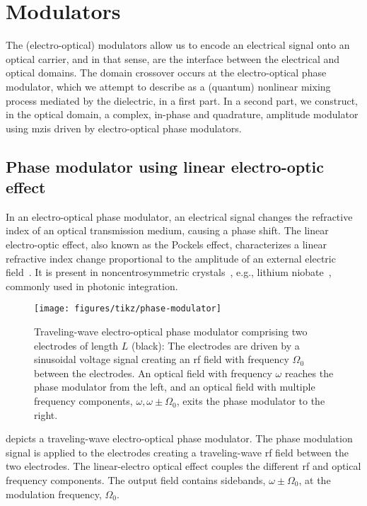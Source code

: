 \section{Modulators}

The (electro-optical) modulators allow us to encode an electrical signal onto an optical carrier, and in that sense, are the interface between the electrical and optical domains.
The domain crossover occurs at the electro-optical phase modulator, which we attempt to describe as a (quantum) nonlinear mixing process mediated by the dielectric, in a first part.
In a second part, we construct, in the optical domain, a complex, in-phase and quadrature, amplitude modulator using \gls{mzi}s driven by electro-optical phase modulators.

\subsection{Phase modulator using linear electro-optic effect}

In an electro-optical phase modulator, an electrical signal changes the refractive index of an optical transmission medium, causing a phase shift.
The linear electro-optic effect, also known as the Pockels effect, characterizes a linear refractive index change proportional to the amplitude of an external electric field~\cite[Ch.~18]{Saleh2007}.
It is present in noncentrosymmetric crystals~\cite[p.~2]{Boyd2020}, e.g., lithium niobate~\cite[p.~237]{Yariv1984}, commonly used in photonic integration.
\begin{figure}[htb]
    \centering
    \texttt{[image: figures/tikz/phase-modulator]}
    \caption{Traveling-wave electro-optical phase modulator comprising two electrodes of length $L$ (black): The electrodes are driven by a sinusoidal voltage signal creating an \gls{rf} field with frequency $\Omega_0$ between the electrodes. An optical field with frequency $\omega$ reaches the phase modulator from the left, and an optical field with multiple frequency components, $\omega,\omega\pm\Omega_0$, exits the phase modulator to the right.}\label{fig:phase_modulator}
\end{figure}
 depicts a traveling-wave electro-optical phase modulator.
The phase modulation signal is applied to the electrodes creating a traveling-wave \gls{rf} field between the two electrodes.
The linear-electro optical effect couples the different \gls{rf} and optical frequency components.
The output field contains sidebands, $\omega\pm\Omega_0$, at the modulation frequency, $\Omega_0$.

